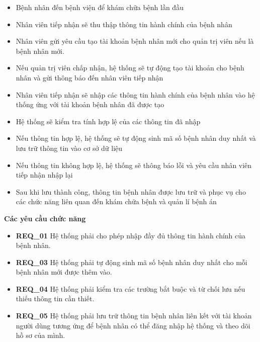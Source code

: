 \begin{itemize}

  \item Bệnh nhân đến bệnh viện để khám chữa bệnh lần đầu
  \item Nhân viên tiếp nhận sẽ thu thập thông tin hành chính của bệnh nhân
  \item Nhân viên gửi yêu cầu tạo tài khoản bệnh nhân mới cho quản trị viên nếu là bệnh nhân mới.
  \item Nếu quản trị viên chấp nhận, hệ thống sẽ tự động tạo tài khoản cho bệnh nhân và gửi thông báo đến nhân viên tiếp nhận
  \item Nhân viên tiếp nhận sẽ nhập các thông tin hành chính của bệnh nhân vào hệ thống ứng với tài khoản bệnh nhân đã được tạo
  \item Hệ thống sẽ kiểm tra tính hợp lệ của các thông tin đã nhập
  \item Nếu thông tin hợp lệ, hệ thống sẽ tự động sinh mã số bệnh nhân duy nhất và lưu trữ thông tin vào cơ sở dữ liệu
  \item Nếu thông tin không hợp lệ, hệ thống sẽ thông báo lỗi và yêu cầu nhân viên tiếp nhận nhập lại
  \item Sau khi lưu thành công, thông tin bệnh nhân được lưu trữ và phục vụ cho các chức năng liên quan đến khám chữa bệnh và quản lí bệnh án

\end{itemize}

\noindent \textbf{Các yêu cầu chức năng}

\begin{itemize}

  \item \textbf{REQ\_01} Hệ thống phải cho phép nhập đầy đủ thông tin hành chính của bệnh nhân.

  \item \textbf{REQ\_03} Hệ thống phải tự động sinh mã số bệnh nhân duy nhất cho mỗi bệnh nhân mới được thêm vào.

  \item \textbf{REQ\_04} Hệ thống phải kiểm tra các trường bắt buộc và từ chối lưu nếu thiếu thông tin cần thiết.

  \item \textbf{REQ\_05} Hệ thống phải lưu trữ thông tin bệnh nhân liên kết với tài khoản người dùng tương ứng để bệnh nhân có thể đăng nhập hệ thống và theo dõi hồ sơ của mình.

\end{itemize}


